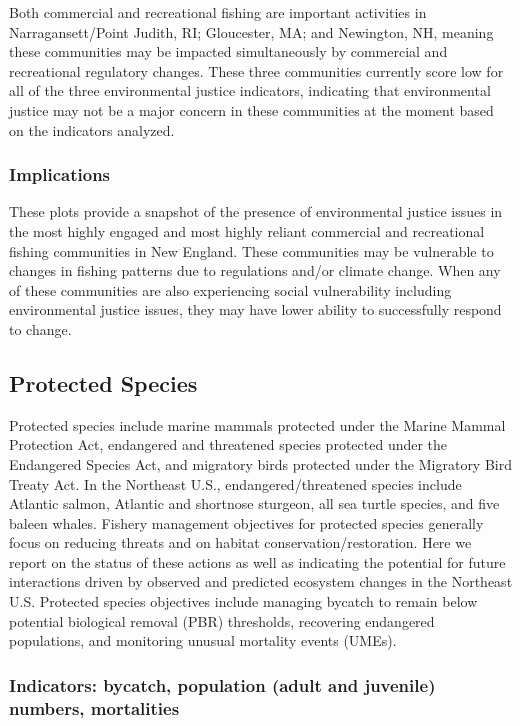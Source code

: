 \documentclass[
  10pt,
]{article}
\begin{document}
Both commercial and recreational fishing are important activities in Narragansett/Point Judith, RI; Gloucester, MA; and Newington, NH, meaning these communities may be impacted simultaneously by commercial and recreational regulatory changes. These three communities currently score low for all of the three environmental justice indicators, indicating that environmental justice may not be a major concern in these communities at the moment based on the indicators analyzed.

\hypertarget{implications-4}{%
\subsubsection{Implications}\label{implications-4}}

These plots provide a snapshot of the presence of environmental justice issues in the most highly engaged and most highly reliant commercial and recreational fishing communities in New England. These communities may be vulnerable to changes in fishing patterns due to regulations and/or climate change. When any of these communities are also experiencing social vulnerability including environmental justice issues, they may have lower ability to successfully respond to change.

\hypertarget{protected-species}{%
\subsection{Protected Species}\label{protected-species}}

Protected species include marine mammals protected under the Marine Mammal Protection Act, endangered and threatened species protected under the Endangered Species Act, and migratory birds protected under the Migratory Bird Treaty Act. In the Northeast U.S., endangered/threatened species include Atlantic salmon, Atlantic and shortnose sturgeon, all sea turtle species, and five baleen whales. Fishery management objectives for protected species generally focus on reducing threats and on habitat conservation/restoration. Here we report on the status of these actions as well as indicating the potential for future interactions driven by observed and predicted ecosystem changes in the Northeast U.S. Protected species objectives include managing bycatch to remain below potential biological removal (PBR) thresholds, recovering endangered populations, and monitoring unusual mortality events (UMEs).

\hypertarget{indicators-bycatch-population-adult-and-juvenile-numbers-mortalities}{%
\subsubsection{Indicators: bycatch, population (adult and juvenile) numbers, mortalities}\label{indicators-bycatch-population-adult-and-juvenile-numbers-mortalities}}
\end{document}
